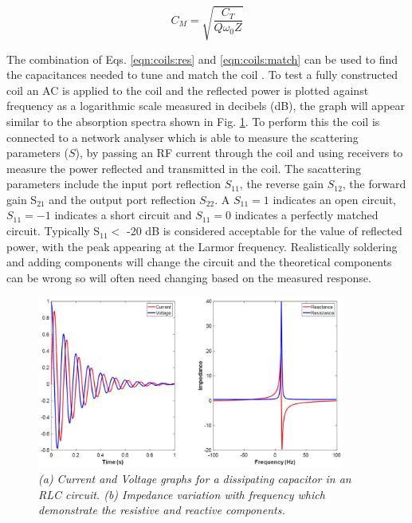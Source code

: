 \begin{equation}
    C_M = \sqrt{\frac{C_T}{Q\omega_0Z}}
    \label{eqn:coils:match}
\end{equation}

The combination of Eqs. \ref{eqn:coils:res} and \ref{eqn:coils:match} can be used to find the capacitances needed to tune and match the coil \cite{Chen1989ChapterNoise}. To test a fully constructed coil an \ac{AC} is applied to the coil and the reflected power is plotted against frequency as a logarithmic scale measured in decibels (dB), the graph will appear similar to the absorption spectra shown in Fig. \ref{fig:coils:VI}. To perform this the coil is connected to a network analyser which is able to measure the scattering parameters ($S$), by passing an \ac{RF} current through the coil and using receivers to measure the power reflected and transmitted in the coil. The sacattering parameters include the input port reflection $S_{11}$, the reverse gain $S_{12}$, the forward gain S$_{21}$ and the output port reflection $S_{22}$. A $S_{11} = 1$ indicates an open circuit, $S_{11} = -1$ indicates a short circuit and $S_{11} = 0$ indicates a perfectly matched circuit. Typically S$_11 <$ -20 dB is considered acceptable for the value of reflected power, with the peak appearing at the Larmor frequency. Realistically soldering and adding components will change the circuit and the theoretical components can be wrong so will often need changing based on the measured response.

\begin{figure}
    \centering
    \includegraphics[width=0.9\textwidth]{Figures/Coils/VI.png}
    \caption{\textit{(a) Current and Voltage graphs for a dissipating capacitor in an RLC circuit. (b) Impedance variation with frequency which demonstrate the resistive and reactive components.}}
    \label{fig:coils:VI}
\end{figure}

